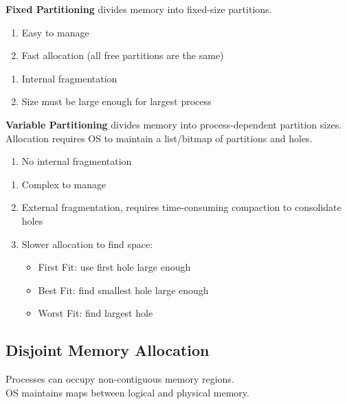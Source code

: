 \documentclass[12pt, a4paper]{article}
\begin{document}
\begin{multicols*}{3}
\textbf{Fixed Partitioning} divides memory into fixed-size partitions.
\begin{enumerate}[$+$]
  \item Easy to manage
  \item Fast allocation (all free partitions are the same)
\end{enumerate}\vspace{-1pt}
\begin{enumerate}[$-$]
  \item Internal fragmentation
  \item Size must be large enough for largest process
\end{enumerate}

\textbf{Variable Partitioning} divides memory into process-dependent partition sizes. Allocation requires OS to maintain a list/bitmap of partitions and holes.
\begin{enumerate}[$+$]
  \item No internal fragmentation
\end{enumerate}\vspace{-1pt}
\begin{enumerate}[$-$]
  \item Complex to manage
  \item External fragmentation, requires time-consuming compaction to consolidate holes
  \item Slower allocation to find space:
    \begin{itemize}[leftmargin=*]
    \vspace{3pt}
    \item First Fit: use first hole large enough
    \item Best Fit: find smallest hole large enough
    \item Worst Fit: find largest hole
  \end{itemize}
\end{enumerate}
\vspace{-1em}
\colbreak
\subsection{Disjoint Memory Allocation}
Processes can occupy non-contiguous memory regions.\\ OS maintains maps between logical and physical memory.


\end{multicols*}
\end{document}
